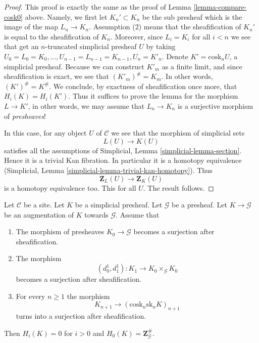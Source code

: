 \begin{proof}
This proof is exactly the same as the proof of
Lemma \ref{lemma-compare-cosk0} above. Namely,
we first let $K_n' \subset K_n$ be the sub presheaf
which is the image of the map $L_n \to K_n$. Assumption
(2) means that the sheafification of $K_n'$ is equal to
the sheafification of $K_n$. Moreover, since $L_i = K_i$
for all $i < n$ we see that get an $n$-truncated
simplicial presheaf $U$ by taking
$U_0 = L_0 = K_0, \ldots, U_{n - 1} = L_{n - 1} = K_{n - 1}, U_n = K'_n$.
Denote $K' = \text{cosk}_n U$, a simplicial presheaf.
Because we can construct $K'_m$ as a finite limit, and
since sheafification is exact, we see that
$(K'_m)^\# = K_m$. In other words, $(K')^\# = K^\#$.
We conclude, by exactness of sheafification once more,
that $H_i(K) = H_i(K')$. Thus it suffices to prove the lemma
for the morphism $L \to K'$, in other words, we may
assume that $L_n \to K_n$ is a surjective morphism
of {\it presheaves}!

\medskip\noindent
In this case, for any object $U$ of $\mathcal{C}$ we
see that the morphism of simplicial sets
$$
L(U) \longrightarrow K(U)
$$
satisfies all the assumptions of
Simplicial, Lemma \ref{simplicial-lemma-section}.
Hence it is a trivial Kan fibration. In particular it is
a homotopy equivalence
(Simplicial, Lemma \ref{simplicial-lemma-trivial-kan-homotopy}).
Thus
$$
\mathbf{Z}_L(U) \longrightarrow \mathbf{Z}_K(U)
$$
is a homotopy equivalence too. This for all $U$.
The result follows.
\end{proof}

\begin{lemma}
\label{lemma-acyclic-hypercover-sheaves}
Let $\mathcal{C}$ be a site.
Let $K$ be a simplicial presheaf.
Let $\mathcal{G}$ be a presheaf.
Let $K \to \mathcal{G}$ be an augmentation of $K$
towards $\mathcal{G}$. Assume that
\begin{enumerate}
\item The morphism of presheaves $K_0 \to \mathcal{G}$ becomes
a surjection after sheafification.
\item The morphism
$$
(d^1_0, d^1_1) :
K_1
\longrightarrow
K_0 \times_\mathcal{G} K_0
$$
becomes a surjection after sheafification.
\item For every $n \geq 1$ the morphism
$$
K_{n + 1} \longrightarrow (\text{cosk}_n \text{sk}_n K)_{n + 1}
$$
turns into a surjection after sheafification.
\end{enumerate}
Then $H_i(K) = 0$ for $i > 0$ and
$H_0(K) = \mathbf{Z}_\mathcal{G}^\#$.
\end{lemma}

